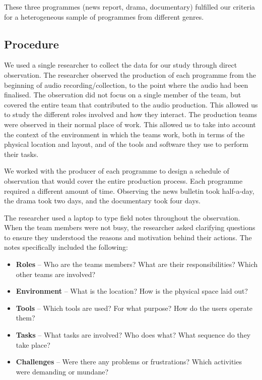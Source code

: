 These three programmes (news report, drama, documentary) fulfilled our criteria for a heterogeneous sample of
programmes from different genres.

\subsection{Procedure}
We used a single researcher to collect the data for our study through direct observation. The researcher observed the
production of each programme from the beginning of audio recording/collection, to the point where the audio had been
finalised. The observation did not focus on a single member of the team, but covered the entire team that
contributed to the audio production. This allowed us to study the different roles involved  and how they interact.  The
production teams were observed in their normal place of work. This allowed us to take into account the context of the
environment in which the teams work, both in terms of the physical location and layout, and of the tools and software
they use to perform their tasks.

We worked with the producer of each programme to design a schedule of observation that would cover the entire
production process. Each programme required a different amount of time. Observing the news bulletin took half-a-day,
the drama took two days, and the documentary took four days. 

The researcher used a laptop to type field notes throughout the observation. When the team members were
not busy, the researcher asked clarifying questions to ensure they understood the reasons and motivation behind their
actions. The notes specifically included the following:

{\singlespacing
\begin{itemize}
	\item \textbf{Roles} -- Who are the teams members? What are their responsibilities? Which other teams are involved?
	\item \textbf{Environment} -- What is the location? How is the physical space laid out?
	\item \textbf{Tools} -- Which tools are used? For what purpose? How do the users operate them?
	\item \textbf{Tasks} -- What tasks are involved? Who does what? What sequence do they take place?
	\item \textbf{Challenges} -- Were there any problems or frustrations? Which activities were demanding or mundane?
\end{itemize}
}

